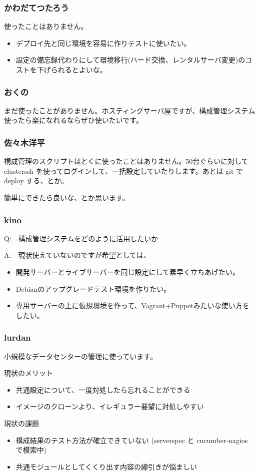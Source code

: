 \documentclass[cjk,dvipdfmx,10pt,compress,%
hyperref={bookmarks=true,bookmarksnumbered=true,bookmarksopen=false,%
colorlinks=false,%
pdftitle={第 75 回 関西 Debian 勉強会},%
pdfauthor={倉敷・のがた・佐々木・かわだ・八津尾},%
pdfsubject={資料},%
}]{beamer}
\begin{document}
\begin{frame}
  \frametitle{ かわだてつたろう }
  使ったことはありません。

  \begin{itemize}
  \item デプロイ先と同じ環境を容易に作りテストに使いたい。
  \item 設定の備忘録代わりにして環境移行(ハード交換、レンタルサーバ変更)のコストを下げられるとよいな。
  \end{itemize}
\end{frame}

\begin{frame}
  \frametitle{ おくの }
  まだ使ったことがありません。ホスティングサーバ屋ですが、構成管理システム使ったら楽になれるならぜひ使いたいです。
\end{frame}

\begin{frame}
  \frametitle{ 佐々木洋平 }
  構成管理のスクリプトはとくに使ったことはありません。50台ぐらいに対して clusterssh を使ってログインして、一括設定していたりします。あとは git で deploy する、とか。

  簡単にできたら良いな、とか思います。
\end{frame}

\begin{frame}
  \frametitle{ kino }
  Q:　構成管理システムをどのように活用したいか

  A:　現状使えていないのですが希望としては、
  \begin{itemize}
  \item 開発サーバーとライブサーバーを同じ設定にして素早く立ちあげたい。
  \item Debianのアップグレードテスト環境を作りたい。
  \item 専用サーバーの上に仮想環境を作って、Vagrant+Puppetみたいな使い方をしたい。
  \end{itemize}
\end{frame}

\begin{frame}
  \frametitle{ lurdan }
  小規模なデータセンターの管理に使っています。

  現状のメリット
  \begin{itemize}
  \item 共通設定について、一度対処したら忘れることができる
  \item イメージのクローンより、イレギュラー要望に対処しやすい
  \end{itemize}

  現状の課題
  \begin{itemize}
  \item 構成結果のテスト方法が確立できていない (serverspec と cucumber-nagios で模索中)
  \item 共通モジュールとしてくくり出す内容の線引きが悩ましい
  \end{itemize}
\end{frame}
\end{document}
